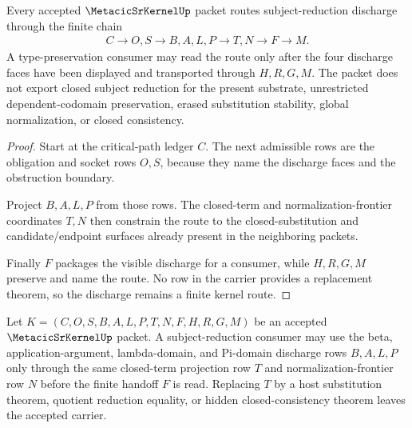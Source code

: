 \begin{theorem}\label{thm:metacic-sr-kernel-discharge-route}
Every accepted $\MetacicSrKernelUp$ packet routes subject-reduction discharge through the finite chain
$$
\begin{gathered}
C \longrightarrow O,S \longrightarrow B,A,L,P \longrightarrow T,N \longrightarrow F \longrightarrow M.
\end{gathered}
$$
A type-preservation consumer may read the route only after the four discharge faces have been displayed and transported through $H,R,G,M$. The packet does not export closed subject reduction for the present substrate, unrestricted dependent-codomain preservation, erased substitution stability, global normalization, or closed consistency.
\end{theorem}

\begin{proof}
Start at the critical-path ledger $C$. The next admissible rows are the obligation and socket rows $O,S$, because they name the discharge faces and the obstruction boundary.

Project $B,A,L,P$ from those rows. The closed-term and normalization-frontier coordinates $T,N$ then constrain the route to the closed-substitution and candidate/endpoint surfaces already present in the neighboring packets.

Finally $F$ packages the visible discharge for a consumer, while $H,R,G,M$ preserve and name the route. No row in the carrier provides a replacement theorem, so the discharge remains a finite kernel route.
\end{proof}

\begin{theorem}\label{thm:metacic-sr-kernel-closed-substitution-discharge}
Let $K=(C,O,S,B,A,L,P,T,N,F,H,R,G,M)$ be an accepted $\MetacicSrKernelUp$ packet. A subject-reduction consumer may use the beta, application-argument, lambda-domain, and Pi-domain discharge rows $B,A,L,P$ only through the same closed-term projection row $T$ and normalization-frontier row $N$ before the finite handoff $F$ is read. Replacing $T$ by a host substitution theorem, quotient reduction equality, or hidden closed-consistency theorem leaves the accepted carrier.
\end{theorem}

